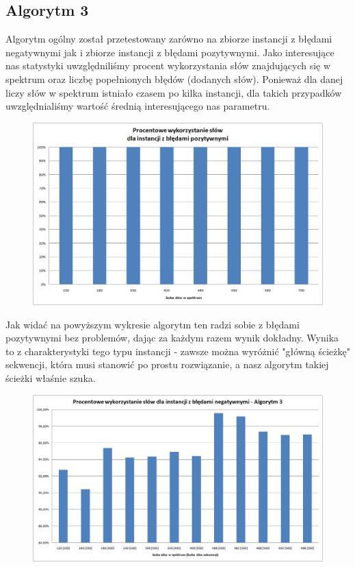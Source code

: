 \documentclass[a4paper,10pt]{article}
\begin{document}
\subsection{Algorytm 3}

Algorytm ogólny został przetestowany zarówno na zbiorze instancji z błędami negatywnymi jak i zbiorze instancji z błędami pozytywnymi. Jako interesujące nas statystyki uwzględniliśmy procent wykorzystania słów znajdujących się w spektrum oraz liczbę popełnionych błędów (dodanych słów). Ponieważ dla danej liczy słów w spektrum istniało czasem po kilka instancji, dla takich przypadków uwzględnialiśmy wartość średnią interesującego nas parametru.

\begin{figure}[h]
  \footnotesize\centering
  \includegraphics[width=\textwidth,keepaspectratio]{percentageUsedWords_general_positive.png}
\end{figure}

Jak widać na powyższym wykresie algorytm ten radzi sobie z błędami pozytywnymi bez problemów, dając za każdym razem wynik dokładny. Wynika to z charakterystyki tego typu instancji - zawsze można wyróżnić "główną ścieżkę" sekwencji, która musi stanowić po prostu rozwiązanie, a nasz algorytm takiej ścieżki właśnie szuka.

\begin{figure}[h]
  \footnotesize\centering
  \includegraphics[width=\textwidth,keepaspectratio]{percentageUsedWords_general_negative.png}
\end{figure}
\end{document}

